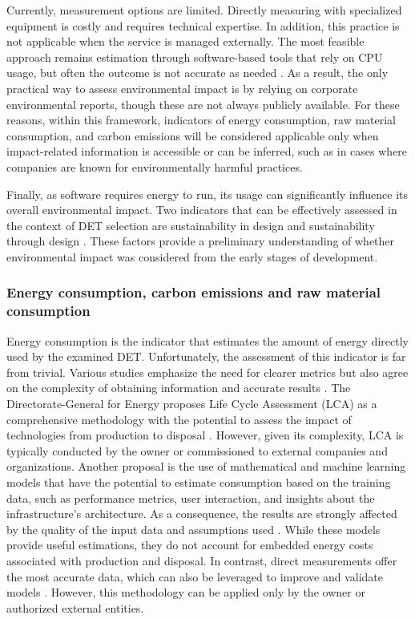 Currently, measurement options are limited. Directly measuring with specialized equipment is costly and requires technical expertise. In addition, this practice is not applicable when the service is managed externally. The most feasible approach remains estimation through software-based tools that rely on CPU usage, but often the outcome is not accurate as needed \cite{hindle_green_2016}. As a result, the only practical way to assess environmental impact is by relying on corporate environmental reports, though these are not always publicly available. For these reasons, within this framework, indicators of energy consumption, raw material consumption, and carbon emissions will be considered applicable only when impact-related information is accessible or can be inferred, such as in cases where companies are known for environmentally harmful practices.

Finally, as software requires energy to run, its usage can significantly influence its overall environmental impact. Two indicators that can be effectively assessed in the context of DET selection are sustainability in design and sustainability through design \cite{mankoff_environmental_2007}. These factors provide a preliminary understanding of whether environmental impact was considered from the early stages of development.

\subsubsection{Energy consumption, carbon emissions and raw material consumption}
Energy consumption is the indicator that estimates the amount of energy directly used by the examined DET. Unfortunately, the assessment of this indicator is far from trivial. Various studies emphasize the need for clearer metrics but also agree on the complexity of obtaining information and accurate results \cite{andrikopoulos_software_2021} \cite{hindle_green_2016}. The Directorate-General for Energy proposes Life Cycle Assessment (LCA) as a comprehensive methodology with the potential to assess the impact of technologies from production to disposal \cite{directorate-general_for_energy_european_commission_assessment_2023}. However, given its complexity, LCA is typically conducted by the owner or commissioned to external companies and organizations. Another proposal is the use of mathematical and machine learning models that have the potential to estimate consumption based on the training data, such as performance metrics, user interaction, and insights about the infrastructure's architecture. As a consequence, the results are strongly affected by the quality of the input data and assumptions used \cite{dlamini_development_2021}. While these models provide useful estimations, they do not account for embedded energy costs associated with production and disposal. In contrast, direct measurements offer the most accurate data, which can also be leveraged to improve and validate models \cite{directorate-general_for_energy_european_commission_assessment_2023}. However, this methodology can be applied only by the owner or authorized external entities.


